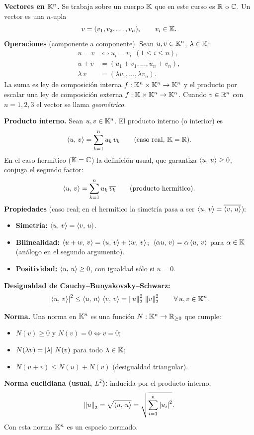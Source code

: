 \begin{teoria}
\textbf{Vectores en $\mathbb{K}^n$.} Se trabaja sobre un cuerpo $\mathbb{K}$ que en este curso es $\mathbb{R}$ o $\mathbb{C}$. Un vector es una $n$-upla
\[
v = (v_1, v_2, \dots, v_n), \qquad v_i \in \mathbb{K}.
\]
\textbf{Operaciones} (componente a componente). Sean $u,v \in \mathbb{K}^n$, $\lambda \in \mathbb{K}$:
\begin{align*}
u = v &\iff u_i = v_i \ \ (1 \le i \le n), \\
u + v &= (u_1 + v_1, \dots, u_n + v_n), \\
\lambda\,v &= (\lambda v_1, \dots, \lambda v_n).
\end{align*}
La suma es ley de composición interna $f:\mathbb{K}^n\times\mathbb{K}^n \to \mathbb{K}^n$ y el producto por escalar una ley de composición externa $f:\mathbb{K}\times\mathbb{K}^n \to \mathbb{K}^n$. Cuando $v \in \mathbb{R}^n$ con $n=1,2,3$ el vector se llama \emph{geométrico}.
\end{teoria}

\begin{teoria}
\textbf{Producto interno.} Sean $u,v \in \mathbb{K}^n$. El producto interno (o interior) es
\[
\left\langle u,\, v \right\rangle = \sum_{k=1}^{n} u_k\,v_k \qquad (\text{caso real, } \mathbb{K} = \mathbb{R}).
\]
En el caso hermítico ($\mathbb{K} = \mathbb{C}$) la definición usual, que garantiza $\left\langle u,\, u \right\rangle \ge 0$, conjuga el segundo factor:
\[
\left\langle u,\, v \right\rangle = \sum_{k=1}^{n} u_k\,\overline{v_k} \qquad (\text{producto hermítico}).
\]
\textbf{Propiedades} (caso real; en el hermítico la simetría pasa a ser $\left\langle u,\, v \right\rangle = \overline{\left\langle v,\, u \right\rangle}$):
\begin{itemize}
  \item \textbf{Simetría:} $\left\langle u,\, v \right\rangle = \left\langle v,\, u \right\rangle$.
  \item \textbf{Bilinealidad:} $\left\langle u+w,\, v \right\rangle = \left\langle u,\, v \right\rangle + \left\langle w,\, v \right\rangle$; $\;\left\langle \alpha u,\, v \right\rangle = \alpha\left\langle u,\, v \right\rangle$ para $\alpha \in \mathbb{K}$ (análogo en el segundo argumento).
  \item \textbf{Positividad:} $\left\langle u,\, u \right\rangle \ge 0$, con igualdad sólo si $u=0$.
\end{itemize}
\textbf{Desigualdad de Cauchy--Bunyakovsky--Schwarz:}
\[
\left\lvert \left\langle u,\, v \right\rangle \right\rvert^2 \le \left\langle u,\, u \right\rangle\,\left\langle v,\, v \right\rangle = \left\lVert u \right\rVert_2^2\,\left\lVert v \right\rVert_2^2 \qquad \forall\,u,v \in \mathbb{K}^n.
\]
\end{teoria}

\begin{teoria}
\textbf{Norma.} Una norma en $\mathbb{K}^n$ es una función $N:\mathbb{K}^n \to \mathbb{R}_{\ge 0}$ que cumple:
\begin{itemize}
  \item $N(v) \ge 0$ y $N(v)=0 \iff v=0$;
  \item $N(\lambda v) = \left\lvert \lambda \right\rvert\,N(v)$ para todo $\lambda \in \mathbb{K}$;
  \item $N(u+v) \le N(u) + N(v)$ (desigualdad triangular).
\end{itemize}
\textbf{Norma euclidiana (usual, $L^2$):} inducida por el producto interno,
\[
\left\lVert u \right\rVert_2 = \sqrt{\left\langle u,\, u \right\rangle} = \sqrt{\sum_{i=1}^n \left\lvert u_i \right\rvert^2}.
\]
Con esta norma $\mathbb{K}^n$ es un espacio normado.
\end{teoria}

